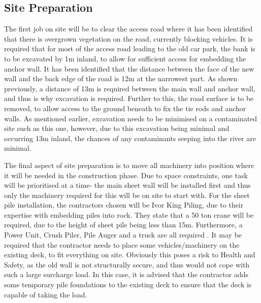 \documentclass[12pt, a4paper]{article}
\begin{document}
\subsection{Site Preparation}
\begin{justify}
The first job on site will be to clear the access road where it has been identified that there is overgrown vegetation on the road, currently blocking vehicles. It is required that for most of the access road leading to the old car park, the bank is to be excavated by 1m inland, to allow for sufficient access for embedding the anchor wall. It has been identified that the distance between the face of the new wall and the back edge of the road is 12m at the narrowest part. As shown previously, a distance of 13m is required between the main wall and anchor wall, and thus is why excavation is required. Further to this, the road surface is to be removed, to allow access to the ground beneath to fix the tie rods and anchor walls. As mentioned earlier, excavation needs to be minimised on a contaminated site such as this one, however, due to this excavation being minimal and occurring 13m inland, the chances of any contaminants seeping into the river are minimal.
\end{justify}
\begin{justify}
The final aspect of site preparation is to move all machinery into position where it will be needed in the construction phase. Due to space constraints, one task will be prioritised at a time- the main sheet wall will be installed first and thus only the machinery required for this will be on site to start with. For the sheet pile installation, the contractors chosen will be Ivor King Piling, due to their expertise with embedding piles into rock. They state that a 50 ton crane will be required, due to the height of sheet pile being less than 15m. Furthermore, a Power Unit, Crush Piler, Pile Auger and a truck are all required \cite{l}. It may be required that the contractor needs to place some vehicles/machinery on the existing deck, to fit everything on site. Obviously this poses a risk to Health and Safety, as the old wall is not structurally secure, and thus would not cope with such a large surcharge load. In this case, it is advised that the contractor adds some temporary pile foundations to the existing deck to ensure that the deck is capable of taking the load.
\end{justify}
\end{document}

